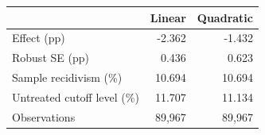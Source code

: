 \begin{center}\small
\renewcommand{\arraystretch}{1.15}
\begin{tabular}{@{}lrr@{}}\toprule
 & Linear & Quadratic\\\midrule
Effect (pp) & -2.362 & -1.432\\
Robust SE (pp) & 0.436 & 0.623\\
Sample recidivism (\%) & 10.694 & 10.694\\
Untreated cutoff level (\%) & 11.707 & 11.134\\
Observations & 89,967 & 89,967\\
\bottomrule\end{tabular}\end{center}
